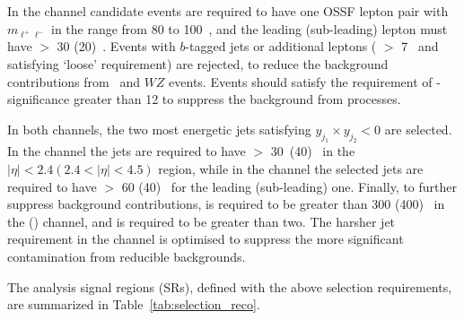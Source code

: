 In the \llvvjj channel candidate events  are required to have one OSSF lepton pair with $m_{\ell^+\ell^-}$ in the range from 80 to 100~\GeV{},
and the leading (sub-leading) lepton must have \pt{} $>$ 30 (20)~\GeV{}.
Events with $b$-tagged jets or additional leptons (\pt{} $>$ 7~\GeV{} and satisfying `loose' requirement) are rejected, to reduce the background contributions from \ttbar~and $WZ$ events.
Events should satisfy the requirement of \met-significance greater than 12 to suppress the background from \Zjet processes.

In both channels, the two most energetic jets satisfying $y_{j_1} \times y_{j_2} < 0$ are selected.
In the \lllljj channel the jets are required to have \pT $>$ 30~(40)~\GeV{} in the $|\eta| < 2.4 (2.4 < |\eta| < 4.5)$ region,
while in the \llvvjj channel the selected jets are required to have \pT $>$ 60 (40)~\GeV{} for the leading (sub-leading) one.
Finally, to further suppress background contributions, \mjj is required to be greater than 300 (400)~\GeV{} in the \lllljj (\llvvjj) channel, and \dyjj is required to be greater than two.
The harsher jet requirement in the \llvvjj channel is optimised to suppress the more significant contamination from reducible backgrounds. 

The analysis signal regions (SRs), defined with the above selection requirements, are summarized in Table~\ref{tab:selection_reco}.

